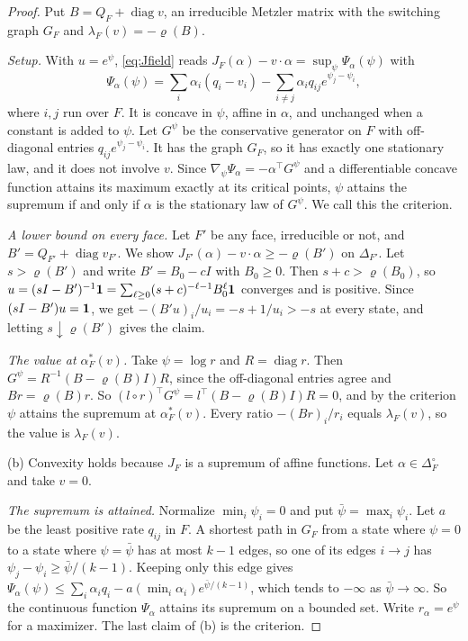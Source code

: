 \begin{proof}
Put $B=Q_F+\operatorname{diag}v$, an irreducible Metzler matrix with the switching
graph $G_F$ and $\lambda_F(v)=-\varrho(B)$.

\emph{Setup.} With $u=e^\psi$, \eqref{eq:Jfield} reads
$J_F(\alpha)-v\cdot\alpha=\sup_\psi\Psi_\alpha(\psi)$ with
\[
\Psi_\alpha(\psi)=\sum_i\alpha_i(q_i-v_i)-\sum_{i\ne j}\alpha_iq_{ij}e^{\psi_j-\psi_i},
\]
where $i,j$ run over $F$. It is concave in $\psi$, affine in $\alpha$, and
unchanged when a constant is added to $\psi$. Let $G^\psi$ be the conservative
generator on $F$ with off-diagonal entries $q_{ij}e^{\psi_j-\psi_i}$. It has the
graph $G_F$, so it has exactly one stationary law, and it does not involve $v$.
Since $\nabla_\psi\Psi_\alpha=-\alpha^\top G^\psi$ and a differentiable concave
function attains its maximum exactly at its critical points, $\psi$ attains the
supremum if and only if $\alpha$ is the stationary law of $G^\psi$. We call this
the criterion.

\emph{A lower bound on every face.} Let $F'$ be any face, irreducible or not, and
$B'=Q_{F'}+\operatorname{diag}v_{F'}$. We show
$J_{F'}(\alpha)-v\cdot\alpha\ge-\varrho(B')$ on $\Delta_{F'}$. Let
$s>\varrho(B')$ and write $B'=B_0-cI$ with $B_0\ge0$. Then $s+c>\varrho(B_0)$, so
$u=(sI-B')^{-1}\mathbf{1}=\sum_{\ell\ge0}(s+c)^{-\ell-1}B_0^\ell\mathbf{1}$ converges and is
positive. Since $(sI-B')u=\mathbf{1}$, we get $-(B'u)_i/u_i=-s+1/u_i>-s$ at every
state, and letting $s\downarrow\varrho(B')$ gives the claim.

\emph{The value at $\alpha^*_F(v)$.} Take $\psi=\log r$ and $R=\operatorname{diag}r$.
Then $G^\psi=R^{-1}(B-\varrho(B)I)R$, since the off-diagonal entries agree and
$Br=\varrho(B)r$. So $(l\circ r)^\top G^\psi=l^\top(B-\varrho(B)I)R=0$, and by the
criterion $\psi$ attains the supremum at $\alpha^*_F(v)$. Every ratio
$-(Br)_i/r_i$ equals $\lambda_F(v)$, so the value is $\lambda_F(v)$.

(b) Convexity holds because $J_F$ is a supremum of affine functions. Let
$\alpha\in\Delta_F^\circ$ and take $v=0$.

\emph{The supremum is attained.} Normalize $\min_i\psi_i=0$ and put
$\bar\psi=\max_i\psi_i$. Let $a$ be the least positive rate $q_{ij}$ in $F$. A
shortest path in $G_F$ from a state where $\psi=0$ to a state where
$\psi=\bar\psi$ has at most $k-1$ edges, so one of its edges $i\to j$ has
$\psi_j-\psi_i\ge\bar\psi/(k-1)$. Keeping only this edge gives
$\Psi_\alpha(\psi)\le\sum_i\alpha_iq_i-a(\min_i\alpha_i)e^{\bar\psi/(k-1)}$, which
tends to $-\infty$ as $\bar\psi\to\infty$. So the continuous function
$\Psi_\alpha$ attains its supremum on a bounded set. Write $r_\alpha=e^\psi$ for a
maximizer. The last claim of (b) is the criterion.


\end{proof}
